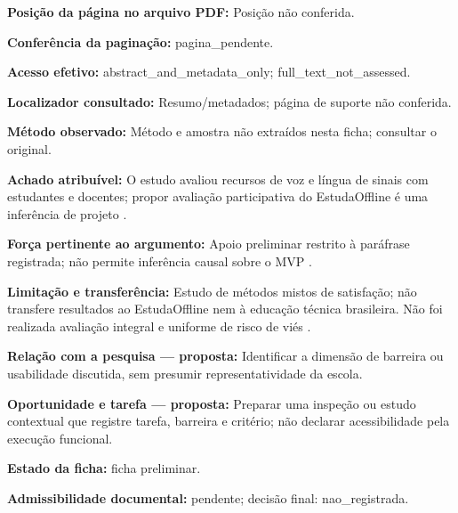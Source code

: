 \noindent\textbf{Posição da página no arquivo PDF:} Posição não conferida.\par\medskip

\noindent\textbf{Conferência da paginação:} pagina\_pendente.\par\medskip

\noindent\textbf{Acesso efetivo:} abstract\_and\_metadata\_only; full\_text\_not\_assessed.\par\medskip

\noindent\textbf{Localizador consultado:} Resumo/metadados; página de suporte não conferida.\par\medskip

\noindent\textbf{Método observado:} Método e amostra não extraídos nesta ficha; consultar o original.\par\medskip

\noindent\textbf{Achado atribuível:} O estudo avaliou recursos de voz e língua de sinais com estudantes e docentes; propor avaliação participativa do EstudaOffline é uma inferência de projeto \citep{farhan2020}.\par\medskip

\noindent\textbf{Força pertinente ao argumento:} Apoio preliminar restrito à paráfrase registrada; não permite inferência causal sobre o MVP \citep{farhan2020}.\par\medskip

\noindent\textbf{Limitação e transferência:} Estudo de métodos mistos de satisfação; não transfere resultados ao EstudaOffline nem à educação técnica brasileira. Não foi realizada avaliação integral e uniforme de risco de viés \citep{farhan2020}.\par\medskip

\noindent\textbf{Relação com a pesquisa — proposta:} Identificar a dimensão de barreira ou usabilidade discutida, sem presumir representatividade da escola.\par\medskip

\noindent\textbf{Oportunidade e tarefa — proposta:} Preparar uma inspeção ou estudo contextual que registre tarefa, barreira e critério; não declarar acessibilidade pela execução funcional.\par\medskip

\noindent\textbf{Estado da ficha:} ficha preliminar.\par\medskip

\noindent\textbf{Admissibilidade documental:} pendente; decisão final: nao\_registrada.\par\medskip

